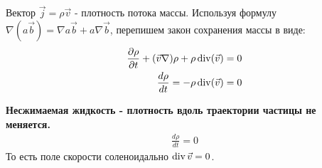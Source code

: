 Вектор $ \vec{j}=\rho \vec{v} $ - плотность потока массы. Используя формулу $ \nabla(a \vec{b})=\nabla a \vec{b}+a \nabla \vec{b} $, перепишем закон сохранения массы в виде:
\begin{align*} 
\frac{\partial \rho}{\partial t}+(\vec{v} \nabla) \rho+\rho \operatorname{div}(\vec{v})=0 \\
\frac{d \rho}{d t}=-\rho \operatorname{div}(\vec{v})=0
\end{align*}

\textbf{Несжимаемая жидкость - плотность вдоль траектории частицы не меняется.}
\begin{align*} 
\frac{d \rho}{d t}=0
\end{align*}
То есть поле скорости соленоидально $\operatorname{div}\vec{v}=0$.